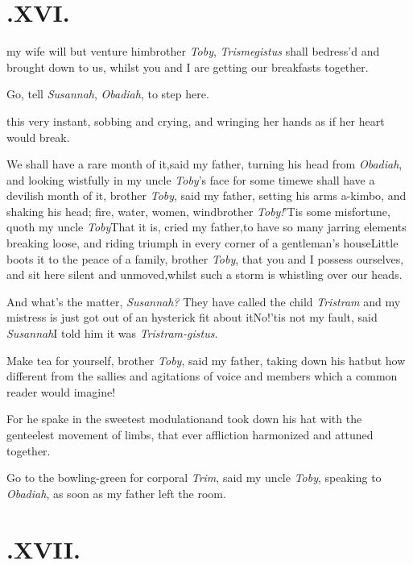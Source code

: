 \documentclass{article}
\begin{document}
\bigskip
\section{.\enspace XVI.}

 my wife will but venture
him\tsk brother \textit{Toby}, \textit{Trismegistus} shall
be\break dress’d
and brought down to us, whilst you and I are getting our breakfasts
together.\tsk

\tsk Go, tell \textit{Susannah}, \textit{Obadiah}, to step
here.

\break
this very instant, sobbing and crying,\break
and wringing her hands as if her heart\break
would break.\tsh{}

We shall have a rare month of it,\break said my father, turning his
head from \textit{Obadiah}, and looking wistfully in my uncle
\textit{Toby}’s face for some time\tsk we shall have a
devilish month of it, brother \textit{Toby}, said my father, setting
his arms a-kimbo, and shaking his head; fire, water, wo\-men,
wind\tsk brother \textit{Toby!}\tsk ’Tis some misfortune,
quoth my uncle \textit{Toby}\tsk That it is, cried my
father,\tsk to have so many jarring elements breaking loose, and
riding triumph in every corner of a gentleman’s house\tsk Little boots it to the peace
of a family, brother \textit{Toby}, that you and I possess ourselves,
and sit here silent and unmoved,\tsk whilst such a storm is
whistling over our heads.\tsh

\tsk And what’s the matter, \textit{Susannah?}\break
They have called the child \textit{Tristram}\tsh\break
and my mistress is just got out of an
hysterick fit about
it\tsk No!\tsk ’tis not my fault, said
\textit{Susannah}\tsk I told him it was \textit{Tristram-gistus}.

\tsh Make tea for yourself, brother \textit{Toby}, said
my father, taking down his hat\tsk but how different from
the sallies and agitations of voice and members which a common
reader would imagine!

\tsk For he spake in the sweetest modulation\tsk and took
down his hat with the genteelest movement of limbs, that ever
affliction harmonized and attuned together.

\tsh Go to the bowling-green for corporal \textit{Trim},
said my uncle \textit{Toby}, speaking to \textit{Obadiah}, as soon as
my father left the room.

\null\smallskip
\section{.\enspace XVII.}
\end{document}
